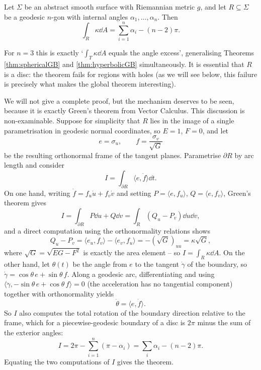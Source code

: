 \documentclass[a4paper]{scrartcl}
\begin{document}
\begin{theorem}\label{thm:localGB}
    Let $\Sigma$ be an abstract smooth surface with Riemannian metric $g$, and let $R \subseteq \Sigma$ be a geodesic $n$-gon with internal angles $\alpha_1, \dots, \alpha_n$. Then
    $$
    \int_R \kappa \dd A = \sum_{i=1}^n \alpha_i - (n - 2)\pi.
    $$
\end{theorem}

For $n = 3$ this is exactly `$\int_T \kappa \dd A$ equals the angle excess', generalising Theorems \ref{thm:sphericalGB} and \ref{thm:hyperbolicGB} simultaneously. It is essential that $R$ is a disc: the theorem fails for regions with holes (as we will see below, this failure is precisely what makes the global theorem interesting).

We will not give a complete proof, but the mechanism deserves to be seen, because it is exactly Green's theorem from Vector Calculus. This discussion is non-examinable. Suppose for simplicity that $R$ lies in the image of a single parametrisation in geodesic normal coordinates, so $E = 1$, $F = 0$, and let
$$
e = \sigma_u, \qquad f = \frac{\sigma_v}{\sqrt{G}}
$$
be the resulting orthonormal frame of the tangent planes. Parametrise $\partial R$ by arc length and consider
$$
I = \int_{\partial R} \langle e, \dot f \rangle \dd t.
$$
On one hand, writing $\dot f = f_u \dot u + f_v \dot v$ and setting $P = \langle e, f_u \rangle$, $Q = \langle e, f_v \rangle$, Green's theorem gives
$$
I = \int_{\partial R} P \dd u + Q \dd v = \int_R (Q_u - P_v) \dd u \dd v,
$$
and a direct computation using the orthonormality relations shows
$$
Q_u - P_v = \langle e_u, f_v \rangle - \langle e_v, f_u \rangle = -(\sqrt{G})_{uu} = \kappa \sqrt{G},
$$
where $\sqrt{G} = \sqrt{EG - F^2}$ is exactly the area element -- so $I = \int_R \kappa \dd A$.
On the other hand, let $\theta(t)$ be the angle from $e$ to the tangent $\dot\gamma$ of the boundary, so $\dot\gamma = \cos\theta\, e + \sin\theta \, f$. Along a geodesic arc, differentiating and using $\langle \ddot\gamma, -\sin\theta \, e + \cos\theta\, f \rangle = 0$ (the acceleration has no tangential component) together with orthonormality yields
$$
\dot\theta = \langle e, \dot f\rangle.
$$
So $I$ also computes the total rotation of the boundary direction relative to the frame, which for a piecewise-geodesic boundary of a disc is $2\pi$ minus the sum of the exterior angles:
$$
I = 2\pi - \sum_{i=1}^n (\pi - \alpha_i) = \sum_i \alpha_i - (n - 2)\pi.
$$
Equating the two computations of $I$ gives the theorem.
\end{document}
